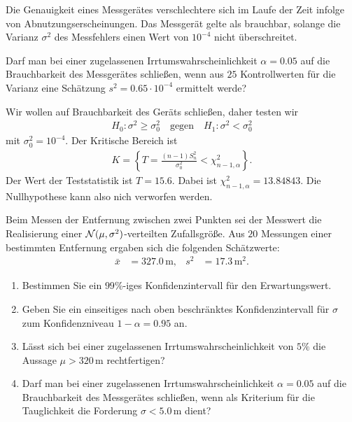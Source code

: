  Die Genauigkeit eines Messgerätes verschlechtere
sich im Laufe der Zeit infolge von Abnutzungserscheinungen. Das Messgerät gelte
als brauchbar, solange die Varianz $\sigma^2$ des Messfehlers einen Wert von
$10^{-4}$ nicht überschreitet.

Darf man bei einer zugelassenen Irrtumswahrscheinlichkeit $\alpha=0.05$ auf die
Brauchbarkeit des Messgerätes schließen, wenn aus $25$ Kontrollwerten für die
Varianz eine Schätzung $s^2 = 0.65 \cdot{} 10^{-4}$ ermittelt werde? 

\solution Wir wollen auf Brauchbarkeit des Geräts schließen, daher 
testen wir
\begin{align*}
    H_0 : \sigma^2 \geq \sigma^2_0 \quad\text{gegen}\quad H_1 : \sigma^2 < \sigma^2_0 
\end{align*}
mit $\sigma^2_0=10^{-4}$. Der Kritische Bereich ist 
\begin{align*}
    K = \left\{ T = \frac{(n-1) S^2_n}{\sigma^2_0} < \chi^2_{n-1, \alpha}   \right\}.
\end{align*}
Der Wert der Teststatistik ist $T = 15.6$. Dabei ist $\chi^2_{n-1, \alpha} =
13.84843$. Die Nullhypothese kann also nich verworfen werden. 

 Beim Messen der
Entfernung zwischen zwei Punkten sei der Messwert die Realisierung einer
$\mathcal N(\mu,\sigma^2)$-verteilten Zufallsgröße. Aus $20$ Messungen einer
bestimmten Entfernung ergaben sich die folgenden Schätzwerte:
\begin{align*}
    \bar x &= 327.0\,\text{m}, & s^2 &= 17.3\, \text{m}^2.
\end{align*}
\begin{enumerate}
    \item Bestimmen Sie ein $99\%$-iges Konfidenzintervall für den Erwartungswert.
    \item Geben Sie ein einseitiges nach oben beschränktes Konfidenzintervall für 
        $\sigma$ zum Konfidenzniveau $1-\alpha = 0.95$ an. 
    \item Lässt sich bei einer zugelassenen Irrtumswahrscheinlichkeit von $5\%$ die Aussage
        $\mu>320\,\text{m}$ rechtfertigen?
    \item Darf man bei einer zugelassenen Irrtumswahrscheinlichkeit $\alpha=0.05$ auf die
        Brauchbarkeit des Messgerätes schließen, wenn als Kriterium für die Tauglichkeit
        die Forderung $\sigma<5.0\,\text{m}$ dient?
\end{enumerate}

